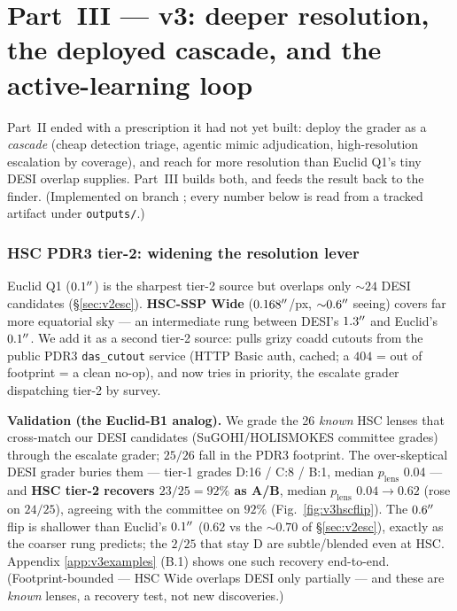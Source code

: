 \documentclass[11pt,letterpaper]{article}
\newcommand{\plens}{\ensuremath{p_{\mathrm{lens}}}}
\newcommand{\hscCov}{25}\newcommand{\hscNcov}{26}     %
\newcommand{\hscRecov}{92}           %
\newcommand{\hscMedOne}{0.04}\newcommand{\hscMedTwo}{0.62}  %
\newcommand{\hscAgree}{92}           %
\newcommand{\xmEuclidN}{24}\newcommand{\xmSugohiN}{76}\newcommand{\xmTotalN}{100}
\begin{document}
\part{Part~III --- v3: deeper resolution, the deployed cascade, and the active-learning loop}

Part~II ended with a prescription it had not yet built: deploy the grader as a \emph{cascade} (cheap
detection triage, agentic mimic adjudication, high-resolution escalation by coverage), and reach for
more resolution than Euclid Q1's tiny DESI overlap supplies. Part~III builds both, and feeds the
result back to the finder. (Implemented on branch ; every number below is read from
a tracked artifact under \texttt{outputs/}.)

\section{HSC PDR3 tier-2: widening the resolution lever}
\label{sec:v3hsc}
Euclid Q1 ($0.1^{\prime\prime}$) is the sharpest tier-2 source but overlaps only ${\sim}\xmEuclidN$ DESI
candidates (\S\ref{sec:v2esc}). \textbf{HSC-SSP Wide} ($0.168^{\prime\prime}$/px, ${\sim}0.6^{\prime\prime}$ seeing)
covers far more equatorial sky --- an intermediate rung between DESI's $1.3^{\prime\prime}$ and Euclid's
$0.1^{\prime\prime}$. We add it as a second tier-2 source:  pulls grizy coadd
cutouts from the public PDR3 \texttt{das\_cutout} service (HTTP Basic auth, cached; a $404$ = out of
footprint = a clean no-op), and  now tries  in priority,
the escalate grader dispatching tier-2 by survey.

\textbf{Validation (the Euclid-B1 analog).} We grade the \hscNcov{} \emph{known} HSC lenses that
cross-match our DESI candidates (SuGOHI/HOLISMOKES committee grades) through the escalate grader;
$\hscCov/\hscNcov$ fall in the PDR3 footprint. The over-skeptical DESI grader buries them --- tier-1
grades D:16 / C:8 / B:1, median \plens{} \hscMedOne{} --- and \textbf{HSC tier-2 recovers
$23/25={\hscRecov}\%$ as A/B}, median \plens{} $\hscMedOne\!\to\!\hscMedTwo$ (rose on $24/25$),
agreeing with the committee on $\hscAgree\%$ (Fig.~\ref{fig:v3hscflip}). The $0.6^{\prime\prime}$ flip is
shallower than Euclid's $0.1^{\prime\prime}$ ($\hscMedTwo$ vs the ${\sim}0.70$ of \S\ref{sec:v2esc}), exactly
as the coarser rung predicts; the $2/25$ that stay D are subtle/blended even at HSC. Appendix
\ref{app:v3examples} (B.1) shows one such recovery end-to-end. (Footprint-bounded --- HSC Wide
overlaps DESI only partially --- and these are \emph{known} lenses, a recovery test, not new
discoveries.)
\end{document}
